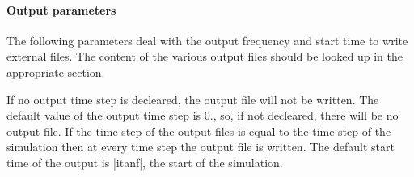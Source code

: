 \paragraph{Output parameters}

The following parameters deal with the output frequency
and start time to write external files. The content of the various
output files should be looked up in the appropriate section.

If no output time step is decleared, the output file will not be written. 
The default value of the output time step is 0., so, if not decleared, there will be no output file. If the time step of the
output files is equal to the time step of the simulation then
at every time step the output file is written. The default start time
of the output is |itanf|, the start of the simulation.

\par

\par

